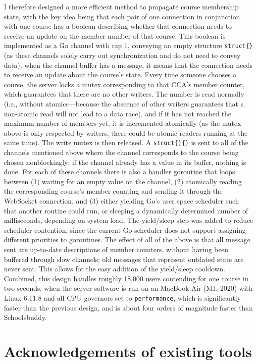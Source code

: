 I therefore designed a more efficient method to propagate course
membership state, with the key idea being that each pair of one
connection in conjunction with one course has a boolean describing
whether that connection needs to receive an update on the member
number of that course. This boolean is implemented as a Go channel
with cap 1, conveying an empty structure \texttt{struct\{\}} (as these
channels solely carry out synchronization and do not need to convey
data); when the channel buffer has a message, it means that the
connection needs to receive an update about the course's state. Every
time someone chooses a course, the server locks a mutex corresponding
to that CCA's member counter, which guarantees that there are no other
writers. The number is read normally (i.e., without atomics---because
the abscence of other writers guarantees that a non-atomic read will
not lead to a data race), and if it has not reached the maximum number
of members yet, it is incremented atomically (as the mutex above is
only respected by writers, there could be atomic readers running at
the same time). The write mutex is then released. A
\texttt{struct\{\}\{\}} is sent to all of the channels mentioned
above where the channel corresponds to the course being chosen
nonblockingly: if the channel already has a value in its buffer,
nothing is done. For each of these channels there is also a handler
goroutine that loops between (1) waiting for an empty value on the
channel, (2) atomically reading the corresponding course's member
counting and sending it through the WebSocket connection, and (3)
either yielding Go's user space scheduler such that another routine
could run, or sleeping a dynamically determined number of
milliseconds, depending on system load. The yield/sleep step was added
to reduce scheduler contention, since the current Go scheduler does
not support assigning different priorities to goroutines. The effect
of all of the above is that all message sent are up-to-date
descriptions of member counters, without having been buffered through
slow channels; old messages that represent outdated state are never
sent. This allows for the easy addition of the yield/sleep cooldown.
Combined, this design handles roughly 18,000 users contending for one
course in two seconds, when the server software is run on an MacBook
Air (M1, 2020) with Linux 6.11.8 and all CPU governors set
to \texttt{performance}, which is significantly faster than the
previous design, and is about four orders of magnitude faster than
Schoolsbuddy.

\section{Acknowledgements of existing tools}


